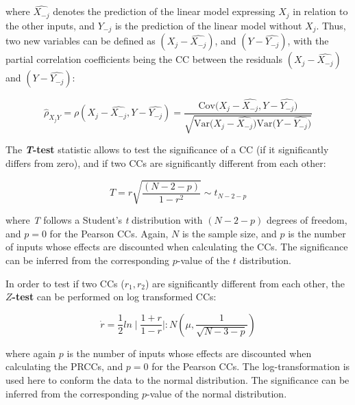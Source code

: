 \documentclass[12pt]{article}
\begin{document}
{	%
where $\widehat{X_{-j}}$ denotes the prediction of the linear model expressing $X_{j}$ in relation to the other inputs, and  $\widehat{Y_{-j}}$ is the prediction of the linear model without $X_{j}$. Thus, two new variables can be defined as $(X_{j}-\widehat{X_{-j}})$, and $(Y-\widehat{Y_{-j}})$, with the partial correlation coefficients being the CC between the residuals $(X_{j}-\widehat{X_{-j}})$ and $(Y-\widehat{Y_{-j}})$:

\begin{equation}
\hat \rho_{X_{j}Y}=\rho(X_{j}-\widehat{X_{-j}},Y-\widehat{Y_{-j}})=\frac{\text{Cov}\big(X_{j}-\widehat{X_{-j}},Y-\widehat{Y_{-j}}\big)}{\sqrt{\text{Var}\big(X_{j}-\widehat{X_{-j}}\big)\text{Var}\big(Y-\widehat{Y_{-j}}\big)}}
\end{equation}


\vspace{1cm}
The \textbf{\textit{T}-test} statistic allows to test the significance of a CC (if it significantly differs from zero), and if two CCs are significantly different from each other:

\begin{equation}
T=r \sqrt{\frac{(N-2-p)}{1-r^{2}}} \sim t_{N-2-p}
\end{equation}

\vspace{0.5cm}
where \textit{T}  follows a Student's \textit{t} distribution with $(N-2-p)$ degrees of freedom, and $p=0$ for the Pearson CCs. Again, $N$ is the sample size, and $p$ is the number of inputs whose effects are discounted when calculating the CCs. The significance can be inferred from the corresponding $p$-value of the $t$ distribution. 

In order to test if two CCs ($r_{1}, r_{2}$) are significantly different from each other, the \textbf{$Z$-test} can be performed on log transformed CCs:

\begin{equation}
  \dot r=\frac{1}{2}ln\mid\frac{1+r}{1-r}\mid: N(\mu,\frac{1}{\sqrt{N-3-p}})
\end{equation}

\vspace{0.5cm}
where again $p$ is the number of inputs whose effects are discounted when calculating the PRCCs, and $p=0$ for the Pearson CCs. The log-transformation is used here to conform the data to the normal distribution. The significance can be inferred from the corresponding $p$-value of the normal distribution. 

}
\end{document}
